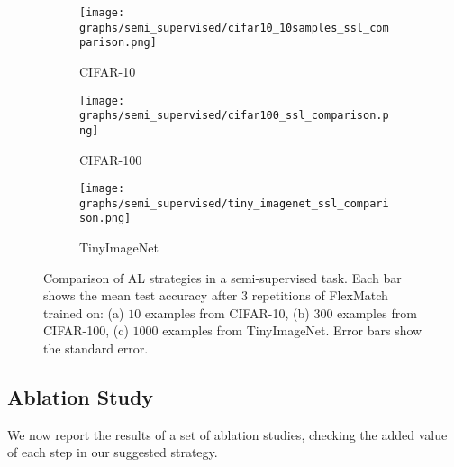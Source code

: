 \documentclass{article}
\begin{document}
\begin{figure}[htb!]
\begin{center}
    \begin{subfigure}{.157\textwidth}
      \centering
      \texttt{[image: graphs/semi\_supervised/cifar10\_10samples\_ssl\_comparison.png]}
    \vspace{-0.65cm}
    \caption{CIFAR-10}
    \label{fig:ssl_cifar_10_with_10_examples}
    \end{subfigure}
    \begin{subfigure}{.157\textwidth}
      \centering
      \texttt{[image: graphs/semi\_supervised/cifar100\_ssl\_comparison.png]}
    \vspace{-0.75cm}
    \caption{CIFAR-100}
    \label{fig:ssl_cifar_100_with_300_examples}
    \end{subfigure}
    \begin{subfigure}{.157\textwidth}
      \centering
      \texttt{[image: graphs/semi\_supervised/tiny\_imagenet\_ssl\_comparison.png]}
    \vspace{-0.75cm}
    \caption{TinyImageNet}
    \label{fig:ssl_tiny_imagenet_with_1000_examples}
    \end{subfigure}
\vspace{-0.35cm}
\caption{Comparison of AL strategies in a semi-supervised task. Each bar shows the mean test accuracy after $3$ repetitions of FlexMatch trained on: (a) $10$ examples from CIFAR-10, (b) $300$ examples from CIFAR-100, (c) $1000$ examples from TinyImageNet. Error bars show the standard error. }
\label{fig:semi_supervised}
\vspace{-0.15cm}
\end{center}
\end{figure}



\subsection{Ablation Study}
\label{sec:ablation_study}
We now report the results of a set of ablation studies, checking the added value of each step in our suggested strategy.
\end{document}
